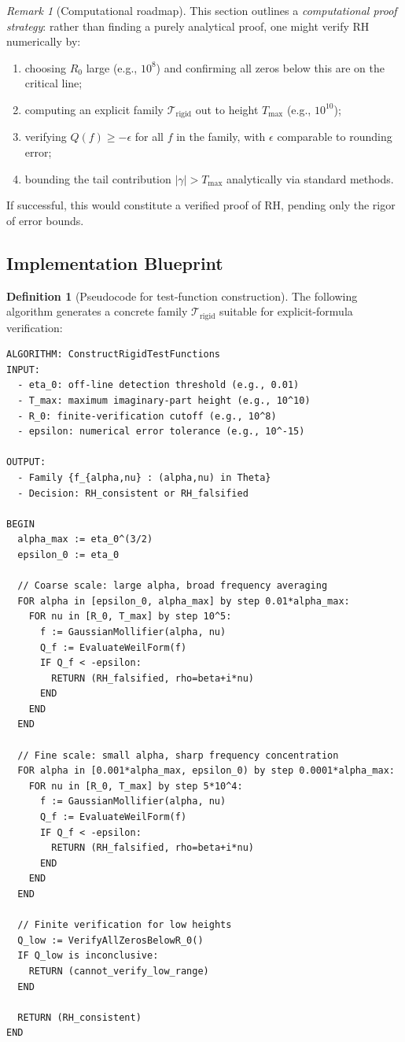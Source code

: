 \documentclass[11pt]{article}
\theoremstyle{plain}
\theoremstyle{definition}
\newtheorem{definition}[theorem]{Definition}
\theoremstyle{remark}
\newtheorem{remark}[theorem]{Remark}
\begin{document}
\begin{remark}[Computational roadmap]
This section outlines a \emph{computational proof strategy}: rather than finding a purely analytical proof,
one might verify RH numerically by:
\begin{enumerate}
  \item choosing $R_0$ large (e.g., $10^8$) and confirming all zeros below this are on the critical line;
  \item computing an explicit family $\mathcal{T}_{\mathrm{rigid}}$ out to height $T_{\max}$ (e.g., $10^{10}$);
  \item verifying $Q(f)\ge -\epsilon$ for all $f$ in the family, with $\epsilon$ comparable to rounding error;
  \item bounding the tail contribution $|\gamma|>T_{\max}$ analytically via standard methods.
\end{enumerate}
If successful, this would constitute a verified proof of RH, pending only the rigor of error bounds.
\end{remark}

\subsection{Implementation Blueprint}

\begin{definition}[Pseudocode for test-function construction]
The following algorithm generates a concrete family $\mathcal{T}_{\mathrm{rigid}}$ suitable for explicit-formula verification:

\begin{verbatim}
ALGORITHM: ConstructRigidTestFunctions
INPUT:
  - eta_0: off-line detection threshold (e.g., 0.01)
  - T_max: maximum imaginary-part height (e.g., 10^10)
  - R_0: finite-verification cutoff (e.g., 10^8)
  - epsilon: numerical error tolerance (e.g., 10^-15)

OUTPUT:
  - Family {f_{alpha,nu} : (alpha,nu) in Theta}
  - Decision: RH_consistent or RH_falsified

BEGIN
  alpha_max := eta_0^(3/2)
  epsilon_0 := eta_0

  // Coarse scale: large alpha, broad frequency averaging
  FOR alpha in [epsilon_0, alpha_max] by step 0.01*alpha_max:
    FOR nu in [R_0, T_max] by step 10^5:
      f := GaussianMollifier(alpha, nu)
      Q_f := EvaluateWeilForm(f)
      IF Q_f < -epsilon:
        RETURN (RH_falsified, rho=beta+i*nu)
      END
    END
  END

  // Fine scale: small alpha, sharp frequency concentration
  FOR alpha in [0.001*alpha_max, epsilon_0) by step 0.0001*alpha_max:
    FOR nu in [R_0, T_max] by step 5*10^4:
      f := GaussianMollifier(alpha, nu)
      Q_f := EvaluateWeilForm(f)
      IF Q_f < -epsilon:
        RETURN (RH_falsified, rho=beta+i*nu)
      END
    END
  END

  // Finite verification for low heights
  Q_low := VerifyAllZerosBelowR_0()
  IF Q_low is inconclusive:
    RETURN (cannot_verify_low_range)
  END

  RETURN (RH_consistent)
END
\end{verbatim}
\end{definition}
\end{document}
